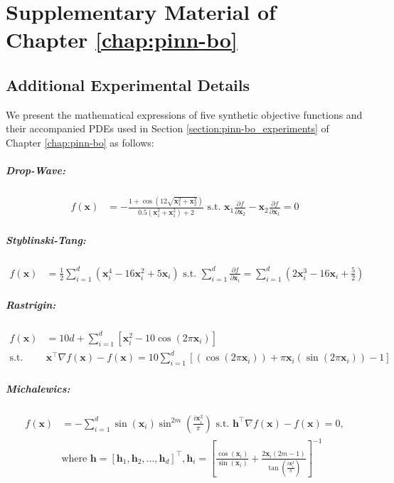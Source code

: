 \allowdisplaybreaks
\chapter{Supplementary Material of Chapter \ref{chap:pinn-bo}} 
\label{section:pinn-bo_supp}
\section{Additional Experimental Details}
\label{section:pinn-bo_experiments_synthetic}
We present the mathematical expressions of five synthetic objective functions and their accompanied PDEs used in Section \ref{section:pinn-bo_experiments} of Chapter \ref{chap:pinn-bo} as follows: 
\paragraph{Drop-Wave:} 
\begin{align*}
    f(\mathbf{x}) &= - \frac{1 + \cos(12\sqrt{\mathbf{x}_1^2 + \mathbf{x}_2^2})}{0.5(\mathbf{x}_1^2 + \mathbf{x}_1^2) + 2} \text{ s.t. } \mathbf{x}_1 \frac{\partial f}{\partial \mathbf{x}_2} - \mathbf{x}_2 \frac{\partial f}{\partial \mathbf{x}_1} = 0
\end{align*}
\paragraph{Styblinski-Tang:}
\begin{align*}
        f(\mathbf{x}) &= \frac{1}{2} \sum_{i=1}^{d} (\mathbf{x}_i^4 - 16\mathbf{x}_i^2 + 5\mathbf{x}_i) \text{ s.t. }  \sum_{i=1}^d \frac{\partial f}{\partial \mathbf{x}_i} = \sum_{i=1}^{d}(2\mathbf{x}_i^3 -16\mathbf{x}_i +\frac{5}{2})
\end{align*}

\paragraph{Rastrigin:}
\begin{align*}
        f(\mathbf{x}) &= 10d + \sum_{i=1}^{d} \left[ \mathbf{x}_i^2 - 10 \cos(2\pi \mathbf{x}_i) \right] 
        \\
        \text{s.t. }  &\mathbf{x}^\top \nabla f(\mathbf{x})  - f(\mathbf{x}) = 10\sum_{i=1}^d \left[ (\cos(2\pi \mathbf{x}_i)) + \pi \mathbf{x}_i (\sin(2\pi \mathbf{x}_i)) - 1 \right]
\end{align*}
\paragraph{Michalewics:}
\begin{align*}
        f(\mathbf{x}) &= -\sum_{i=1}^{d} \sin(\mathbf{x}_i) \sin^{2m}\left(\frac{i\mathbf{x}_i^2}{\pi}\right) \text{ s.t. } \mathbf{h}^\top \nabla f(\mathbf{x}) - f(\mathbf{x}) = 0,\\ & \text{where } \mathbf{h} = [\mathbf{h}_1, \mathbf{h}_2, \dots, \mathbf{h}_d]^\top, \mathbf{h}_i = \left[\frac{\cos(\mathbf{x}_i)}{\sin(\mathbf{x}_i)} + \frac{2\mathbf{x}_i (2m-1)}{\tan(\frac{i\mathbf{x}_i^2}{\pi})}\right]^{-1}
\end{align*}

